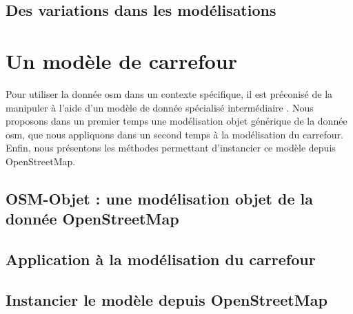 \todo{}

\subsection{Des variations dans les modélisations}


\todo{}

\section{Un modèle de carrefour}

Pour utiliser la donnée \gls{osm} dans un contexte spécifique, il est préconisé de la manipuler à l'aide d'un modèle de donnée spécialisé intermédiaire \cite{Touya2014}. Nous proposons dans un premier temps une modélisation objet générique de la donnée \gls{osm}, que nous appliquons dans un second temps à la modélisation du carrefour. Enfin, nous présentons les méthodes permettant d'instancier ce modèle depuis OpenStreetMap.

\subsection{OSM-Objet : une modélisation objet de la donnée OpenStreetMap}

\todo{}

\subsection{Application à la modélisation du carrefour}

\todo{}

\subsection{Instancier le modèle depuis OpenStreetMap}

\todo{}